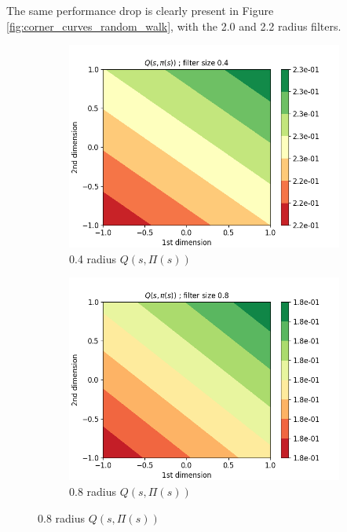 \documentclass{article}
\begin{document}
The same performance drop is clearly present in Figure  \ref{fig:corner_curves_random_walk}, with the 2.0 and 2.2 radius filters.

\begin{figure}[H]
  \centering
   \begin{subfigure}[b]{0.3\linewidth}
    \includegraphics[width=\linewidth]{Study_2/2.4/visualizations/Q_contour_0_4.png}
      \caption{0.4 radius $Q(s, \Pi(s))$}
  \end{subfigure}
   \begin{subfigure}[b]{0.3\linewidth}
    \includegraphics[width=\linewidth]{Study_2/2.4/visualizations/Q_contour_0_8.png}
      \caption{0.8 radius $Q(s, \Pi(s))$}
  \end{subfigure}

\end{figure}
\end{document}
